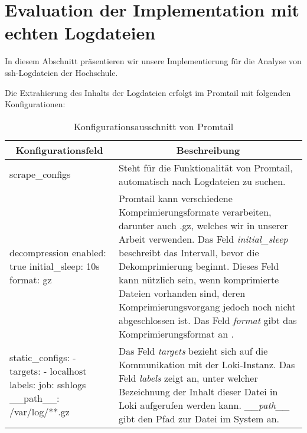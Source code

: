 \section{Evaluation der Implementation mit echten Logdateien}
In diesem Abschnitt präsentieren wir unsere Implementierung für die Analyse von \gls{ssh}-Logdateien der Hochschule. 

Die Extrahierung des Inhalts der Logdateien erfolgt im Promtail mit folgenden Konfigurationen:


\begin{table}[H]
    \begin{tabularx}{\textwidth}{|m{5.5cm}|X|}
    \hline
    \multicolumn{1}{|c|}{\textbf{Konfigurationsfeld}} & \multicolumn{1}{|c|}{\textbf{Beschreibung}} \\
    \hline
    scrape\_configs & Steht für die Funktionalität von Promtail, automatisch nach Logdateien zu suchen. \\
    \hline
    decompression \newline
    \hphantom{12}enabled: true \newline
    \hphantom{12}initial\_sleep: 10s \newline
    \hphantom{12}format: gz & Promtail kann verschiedene Komprimierungsformate verarbeiten, darunter auch .gz, welches wir in unserer Arbeit verwenden. Das Feld \textit{initial\_sleep} beschreibt das Intervall, bevor die Dekomprimierung beginnt. Dieses Feld kann nützlich sein, wenn komprimierte Dateien vorhanden sind, deren Komprimierungsvorgang jedoch noch nicht abgeschlossen ist. Das Feld \textit{format} gibt das Komprimierungsformat an \citep{Grafana_Promtail}.  \\
    \hline
    static\_configs: \newline
    \hphantom{1}- targets: \newline
    \hphantom{123}- localhost \newline
    \hphantom{1}labels: \newline
    \hphantom{123}job: sshlogs \newline
    \hphantom{123}\_\_path\_\_: /var/log/**.gz & Das Feld \textit{targets} bezieht sich auf die Kommunikation mit der Loki-Instanz. Das Feld \textit{labels} zeigt an, unter welcher Bezeichnung der Inhalt dieser Datei in Loki aufgerufen werden kann. \textit{\_\_path\_\_} gibt den Pfad zur Datei im System an.\\
    \hline
    \end{tabularx}
    \caption[Konfigurationsausschnitt von Promtail]
    {Konfigurationsausschnitt von Promtail}
    \label{tab:KonfigPromtail}
\end{table}

